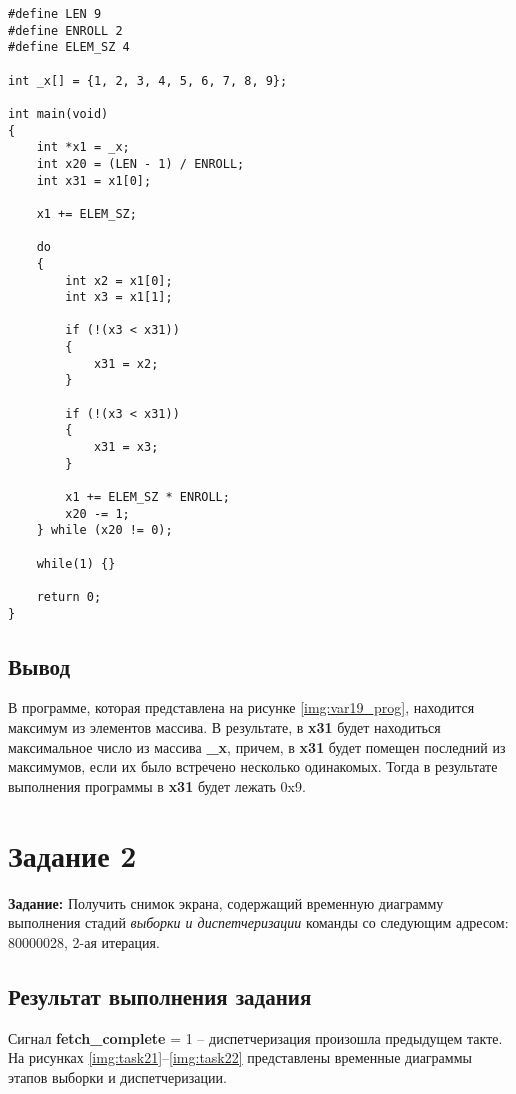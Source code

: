 \clearpage

\begin{center}
    \captionsetup{justification=raggedright,singlelinecheck=off}
    \begin{lstlisting}[label=lst:var19_c,caption=Код программы (на языке Си)]
#define LEN 9
#define ENROLL 2
#define ELEM_SZ 4

int _x[] = {1, 2, 3, 4, 5, 6, 7, 8, 9};

int main(void)
{
	int *x1 = _x;
	int x20 = (LEN - 1) / ENROLL;
	int x31 = x1[0];

	x1 += ELEM_SZ;

	do
	{
		int x2 = x1[0];
		int x3 = x1[1];

		if (!(x3 < x31))
		{
			x31 = x2;
		}

		if (!(x3 < x31))
		{
			x31 = x3;
		}

		x1 += ELEM_SZ * ENROLL;
		x20 -= 1;
	} while (x20 != 0);

	while(1) {}

	return 0;
}
\end{lstlisting}
\end{center}


\subsection{Вывод}

В программе, которая представлена на рисунке \ref{img:var19_prog}, находится максимум из элементов массива. В результате, в \textbf{x31} будет находиться максимальное число из массива \textbf{\_x}, причем, в \textbf{x31} будет помещен последний из максимумов, если их было встречено несколько одинакомых. Тогда в результате выполнения программы в \textbf{x31} будет лежать 0x9.


\section{Задание 2}

\textbf{Задание:} Получить снимок экрана, содержащий временную диаграмму выполнения стадий \textit{выборки и диспетчеризации} команды со следующим адресом: 80000028, 2-ая итерация.

\subsection{Результат выполнения задания}

Сигнал \textbf{fetch\_complete} = 1 -- диспетчеризация произошла предыдущем такте.
На рисунках \ref{img:task21}--\ref{img:task22} представлены временные диаграммы этапов выборки и диспетчеризации.


